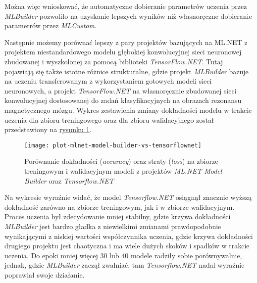 Można więc wnioskować, że automatyczne dobieranie parametrów uczenia przez \emph{MLBuilder} pozwoliło na uzyskanie lepszych wyników niż własnoręczne dobieranie parametrów przez \emph{MLCustom}.

Następnie możemy porównać lepszy z pary projektów bazujących na ML.NET z projektem niestandardowego modelu głębokiej konwolucyjnej sieci neuronowej zbudowanej i wyszkolonej za pomocą biblioteki \emph{TensorFlow.NET}.
Tutaj pojawiają się także istotne różnice strukturalne, gdzie projekt \emph{MLBuilder} bazuje na uczeniu transferowanym z wykorzystaniem gotowych modeli sieci neuronowych, a projekt \emph{TensorFlow.NET} na własnoręcznie zbudowanej sieci konwolucyjnej dostosowanej do zadań klasyfikacyjnych na obrazach rezonansu magnetycznego mózgu.
Wykres zestawienia zmiany dokładności modelu w trakcie uczenia dla zbioru treningowego oraz dla zbioru walidacyjnego został przedstawiony na \hyperref[fig:plot-mlnet-model-builder-vs-tensorflownet]{rysunku \ref*{fig:plot-mlnet-model-builder-vs-tensorflownet}}.

\begin{figure}[ht]
  \texttt{[image: plot-mlnet-model-builder-vs-tensorflownet]}
  \caption[Porównanie dokładności oraz straty modeli ML.NET Model Builder oraz Tensorflow.NET]{Porównanie dokładności (\emph{accuracy}) oraz straty (\emph{loss}) na zbiorze treningowym i walidacyjnym modeli z projektów \emph{ML.NET Model Builder} oraz \emph{Tensorflow.NET}}
  \label{fig:plot-mlnet-model-builder-vs-tensorflownet}
\end{figure}

Na wykresie wyraźnie widać, że model \emph{Tensorflow.NET} osiągnął znacznie wyższą dokładność zarówno na zbiorze treningowym, jak i w zbiorze walidacyjnym.
Proces uczenia był zdecydowanie mniej stabilny, gdzie krzywa dokładności \emph{MLBuilder} jest bardzo gładka z niewielkimi zmianami prawdopodobnie wynikającymi z niskiej wartości współczynnika uczenia, gdzie krzywa dokładności drugiego projektu jest chaotyczna i ma wiele dużych skoków i spadków w trakcie uczenia.
Do epoki mniej więcej $30$ lub $40$ modele radziły sobie porównywalnie, jednak, gdzie \emph{MLBuilder} zaczął zwalniać, tam \emph{Tensorflow.NET} nadal wyraźnie poprawiał swoje działanie.

